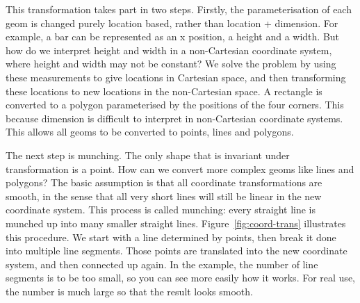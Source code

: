 This transformation takes part in two steps.  Firstly, the parameterisation of each geom is changed purely location based, rather than location + dimension.  For example, a bar can be represented as an x position, a height and a width.  But how do we interpret height and width in a non-Cartesian coordinate system, where height and width may not be constant?  We solve the problem by using these measurements to give locations in Cartesian space, and then transforming these locations to new locations in the non-Cartesian space.  A rectangle is converted to a polygon parameterised by the positions of the four corners.  This because dimension is difficult to interpret in non-Cartesian coordinate systems.  This allows all geoms to be converted to points, lines and polygons.  

The next step is munching.  The only shape that is invariant under transformation is a point.  How can we convert more complex geoms like lines and polygons?  The basic assumption is that all coordinate transformations are smooth, in the sense that all very short lines will still be linear in the new coordinate system.  This process is called munching: every straight line is munched up into many smaller straight lines.  Figure~\ref{fig:coord-trans} illustrates this procedure.  We start with a line determined by points, then break it done into multiple line segments.  Those points are translated into the new coordinate system, and then connected up again.  In the example, the number of line segments is to be too small, so you can see more easily how it works.  For real use, the number is much large so that the result looks smooth.

% 
%
% 


